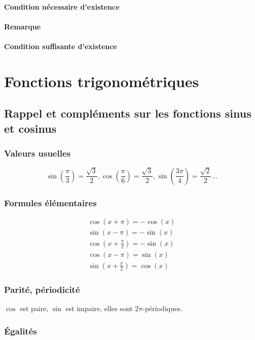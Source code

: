 \documentclass[12pt,a4paper,french]{book}
\begin{document}
			\subsubsection{Condition nécessaire d'existence}
			\subsubsection{Remarque}
			\subsubsection{Condition suffisante d'existence}
			
\chapter{Fonctions trigonométriques}
	\section{Rappel et compléments sur les fonctions sinus et cosinus}
		\subsection{Valeurs usuelles}
			\[\sin\left( \frac{\pi}{3}\right) =\frac{\sqrt{3}}{2},\cos\left( \frac{\pi}{6}\right) =\frac{\sqrt{3}}{2},\sin\left( \frac{3\pi}{4}\right) =\frac{\sqrt{2}}{2}...\]
		\subsection{Formules élémentaires}
			\begin{equation} \begin{split}
				\cos\left(x+\pi\right) = -\cos(x)\\ \sin\left(x-\pi\right) = -\sin(x)\\ \cos\left(x+\frac{\pi}{2}\right) = -\sin(x)\\ \cos\left(x-\pi\right) = \sin(x) \\ \sin\left(x+\frac{\pi}{2}\right) = \cos(x) \end{split}
			\end{equation}
		\subsection{Parité, périodicité}
			$\cos$ est paire, $\sin$ est impaire, elles sont $2\pi$-périodiques.
		\subsection{Égalités}
\end{document}
